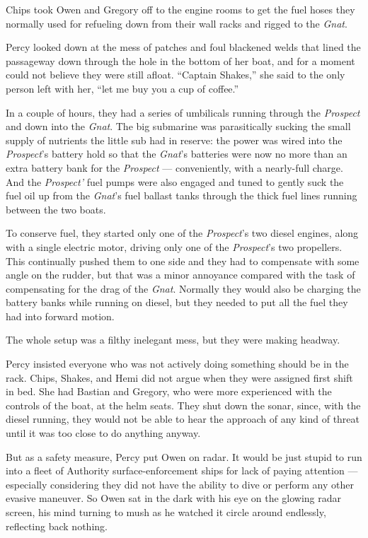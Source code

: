 \documentclass[
]{scrbook}
\begin{document}
Chips took Owen and Gregory off to the engine rooms to get the fuel
hoses they normally used for refueling down from their wall racks and
rigged to the \emph{Gnat}.

Percy looked down at the mess of patches and foul blackened welds that
lined the passageway down through the hole in the bottom of her boat,
and for a moment could not believe they were still afloat. ``Captain
Shakes,'' she said to the only person left with her, ``let me buy you a
cup of coffee.''

\bigskip

In a couple of hours, they had a series of umbilicals running through
the \emph{Prospect} and down into the \emph{Gnat}. The big submarine was
parasitically sucking the small supply of nutrients the little sub had
in reserve: the power was wired into the \emph{Prospect}'s battery hold
so that the \emph{Gnat}'s batteries were now no more than an extra
battery bank for the \emph{Prospect} --- conveniently, with a
nearly-full charge. And the \emph{Prospect'} fuel pumps were also
engaged and tuned to gently suck the fuel oil up from the \emph{Gnat}'s
fuel ballast tanks through the thick fuel lines running between the two
boats.

To conserve fuel, they started only one of the \emph{Prospect}'s two
diesel engines, along with a single electric motor, driving only one of
the \emph{Prospect}'s two propellers. This continually pushed them to
one side and they had to compensate with some angle on the rudder, but
that was a minor annoyance compared with the task of compensating for
the drag of the \emph{Gnat}. Normally they would also be charging the
battery banks while running on diesel, but they needed to put all the
fuel they had into forward motion.

The whole setup was a filthy inelegant mess, but they were making
headway.

Percy insisted everyone who was not actively doing something should be
in the rack. Chips, Shakes, and Hemi did not argue when they were
assigned first shift in bed. She had Bastian and Gregory, who were more
experienced with the controls of the boat, at the helm seats. They shut
down the sonar, since, with the diesel running, they would not be able
to hear the approach of any kind of threat until it was too close to do
anything anyway.

But as a safety measure, Percy put Owen on radar. It would be just
stupid to run into a fleet of Authority surface-enforcement ships for
lack of paying attention --- especially considering they did not have
the ability to dive or perform any other evasive maneuver. So Owen sat
in the dark with his eye on the glowing radar screen, his mind turning
to mush as he watched it circle around endlessly, reflecting back
nothing.
\end{document}
